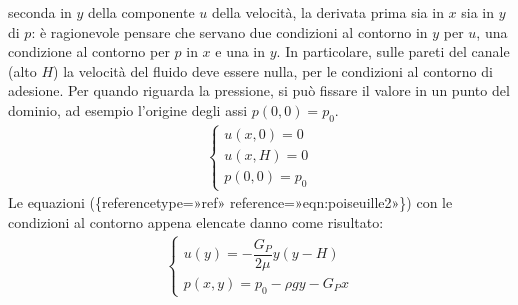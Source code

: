 \documentclass[letterpaper,10pt,italian]{jupyterBook}
\begin{document}
seconda in \(y\) della componente \(u\) della velocità, la derivata prima
sia in \(x\) sia in \(y\) di \(p\): è ragionevole pensare che servano due
condizioni al contorno in \(y\) per \(u\), una condizione al contorno per
\(p\) in \(x\) e una in \(y\). In particolare, sulle pareti del canale (alto
\(H\)) la velocità del fluido deve essere nulla, per le condizioni al
contorno di adesione. Per quando riguarda la pressione, si può fissare
il valore in un punto del dominio, ad esempio l’origine degli assi
\(p(0,0) = p_0\).
\begin{equation*}
\begin{split}\begin{cases}
  u(x,0) = 0 \\
  u(x,H) = 0 \\
  p(0,0) = p_0
 \end{cases}\end{split}
\end{equation*}
\sphinxAtStartPar
Le equazioni
(\{reference\sphinxhyphen{}type=»ref»
reference=»eqn:poiseuille2»\}) con le condizioni al contorno appena
elencate danno come risultato:
\begin{equation*}
\begin{split}\begin{cases}
    u(y) = -\dfrac{G_P}{2 \mu} y (y - H) \\
    p(x,y) = p_0 - \rho g y - G_P x
  \end{cases}\end{split}
\end{equation*}
\end{document}
